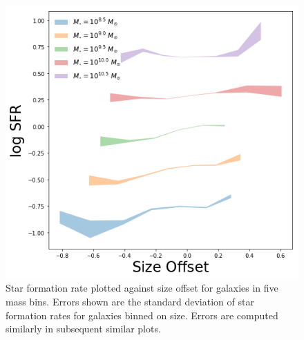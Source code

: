 \documentclass[iop]{emulateapj}
\begin{document}
	

	


\begin{figure}
	\centering
	\includegraphics[width=1.5 \columnwidth]{ha_lum.png}
	\caption{Star formation rate plotted against size offset for galaxies in five mass bins. Errors shown are the standard deviation of star formation rates for galaxies binned on size. Errors are computed similarly in subsequent similar plots.}
     \label{fig:sfr}

\end{figure}
\end{document}
